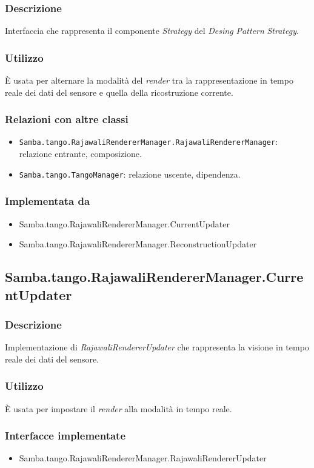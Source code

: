 \subsubsection{Descrizione}
Interfaccia che rappresenta il componente \emph{Strategy} del \emph{Desing Pattern} \emph{Strategy}.
\subsubsection{Utilizzo}
È usata per alternare la modalità del \emph{render} tra la rappresentazione in tempo reale dei dati del sensore e quella della ricostruzione corrente.
\subsubsection{Relazioni con altre classi}
\begin{itemize}
	\item \texttt{Samba.tango.RajawaliRendererManager.RajawaliRendererManager}: relazione entrante, composizione.
	\item \texttt{Samba.tango.TangoManager}: relazione uscente, dipendenza.
\end{itemize}
\subsubsection{Implementata da}
\begin{itemize}
	\item Samba.tango.RajawaliRendererManager.CurrentUpdater
	\item Samba.tango.RajawaliRendererManager.ReconstructionUpdater
\end{itemize}


\subsection{Samba.tango.RajawaliRendererManager.CurrentUpdater}
\subsubsection{Descrizione}
Implementazione di \emph{RajawaliRendererUpdater} che rappresenta la visione in tempo reale dei dati del sensore.
\subsubsection{Utilizzo}
È usata per impostare il \emph{render} alla modalità in tempo reale.
\subsubsection{Interfacce implementate}
\begin{itemize}
	\item Samba.tango.RajawaliRendererManager.RajawaliRendererUpdater
\end{itemize}

